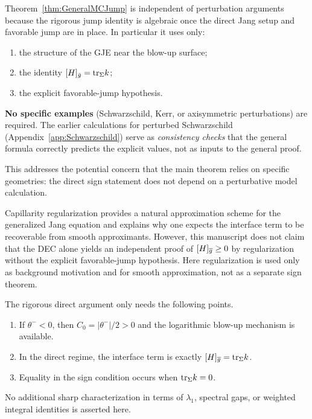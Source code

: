 \begin{remark}\label{rem:IndependencePerturbation}
Theorem~\ref{thm:GeneralMCJump} is independent of perturbation arguments because the rigorous jump identity is algebraic once the direct Jang setup and favorable jump are in place. In particular it uses only:
\begin{enumerate}
    \item the structure of the GJE near the blow-up surface;
    \item the identity $[H]_{\bar g}=\mathrm{tr}_\Sigma k$;
    \item the explicit favorable-jump hypothesis.
\end{enumerate}
\textbf{No specific examples} (Schwarzschild, Kerr, or axisymmetric perturbations) are required. The earlier calculations for perturbed Schwarzschild (Appendix~\ref{app:Schwarzschild}) serve as \emph{consistency checks} that the general formula correctly predicts the explicit values, not as inputs to the general proof.

This addresses the potential concern that the main theorem relies on specific geometries: the direct sign statement does not depend on a perturbative model calculation.
\end{remark}

\begin{remark}\label{rem:AlternativeProofMCJ}
Capillarity regularization provides a natural approximation scheme for the generalized Jang equation and explains why one expects the interface term to be recoverable from smooth approximants. However, this manuscript does not claim that the DEC alone yields an independent proof of $[H]_{\overline{g}}\ge 0$ by regularization without the explicit favorable-jump hypothesis. Here regularization is used only as background motivation and for smooth approximation, not as a separate sign theorem.
\end{remark}

\begin{remark}\label{prop:MCJumpSharpness}
The rigorous direct argument only needs the following points.
\begin{enumerate}
    \item If $\theta^-<0$, then $C_0=|\theta^-|/2>0$ and the logarithmic blow-up mechanism is available.
    \item In the direct regime, the interface term is exactly $[H]_{\overline{g}}=\mathrm{tr}_\Sigma k$.
    \item Equality in the sign condition occurs when $\mathrm{tr}_\Sigma k=0$.
\end{enumerate}
No additional sharp characterization in terms of $\lambda_1$, spectral gaps, or weighted integral identities is asserted here.
\end{remark}


